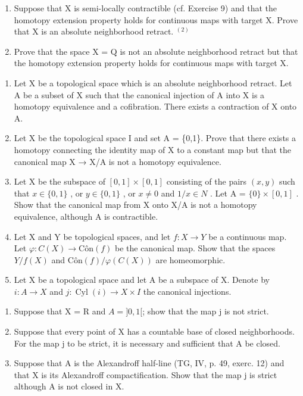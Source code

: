 \begin{enumerate}
\def\labelenumi{\alph{enumi})}
\setcounter{enumi}{2}
\item
  Suppose that X is semi-locally contractible (cf. Exercise 9) and that the homotopy extension property holds for continuous maps with target X. Prove that X is an absolute neighborhood retract. \(^{(2)}\)
\item
  Prove that the space X = Q is not an absolute neighborhood retract but that the homotopy extension property holds for continuous maps with target X.
\end{enumerate}

\begin{enumerate}
\def\labelenumi{\arabic{enumi})}
\setcounter{enumi}{12}
\item
  Let X be a topological space which is an absolute neighborhood retract. Let A be a subset of X such that the canonical injection of A into X is a homotopy equivalence and a cofibration. There exists a contraction of X onto A.
\item
  Let X be the topological space I and set A = \{0,1\}. Prove that there exists a homotopy connecting the identity map of X to a constant map but that the canonical map X → X/A is not a homotopy equivalence.
\item
  Let X be the subspace of \([0,1]\times[0,1]\) consisting of the pairs \((x,y)\) such that \(x\in\{0,1\}\) , or \(y\in\{0,1\}\) , or \(x\neq0\) and \(1/x\in N\) . Let A = \(\{0\}\times[0,1]\) . Show that the canonical map from X onto X/A is not a homotopy equivalence, although A is contractible.
\item
  Let X and Y be topological spaces, and let \(f: X \to Y\) be a continuous map. Let \(\varphi: C(X) \to \text{Côn}(f)\) be the canonical map. Show that the spaces \(Y/f(X)\) and \(\text{Côn}(f)/\varphi(C(X))\) are homeomorphic.
\item
  Let X be a topological space and let A be a subspace of X. Denote by \(i\colon A \to X\) and \(j\colon \operatorname{Cyl}(i) \to X \times I\) the canonical injections.
\end{enumerate}

\begin{enumerate}
\def\labelenumi{\alph{enumi})}
\item
  Suppose that X = R and \(A = ]0, 1[\); show that the map j is not strict.
\item
  Suppose that every point of X has a countable base of closed neighborhoods. For the map j to be strict, it is necessary and sufficient that A be closed.
\item
  Suppose that A is the Alexandroff half-line (TG, IV, p. 49, exerc. 12) and that X is its Alexandroff compactification. Show that the map j is strict although A is not closed in X.
\end{enumerate}

